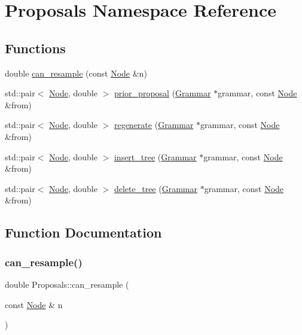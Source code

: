\hypertarget{namespace_proposals}{}\section{Proposals Namespace Reference}
\label{namespace_proposals}
\subsection*{Functions}
\begin{DoxyCompactItemize}
\item 
double \hyperlink{namespace_proposals_a73f20ef1547bc5beef3e6e3adad2139c}{can\+\_\+resample} (const \hyperlink{class_node}{Node} \&n)
\item 
std\+::pair$<$ \hyperlink{class_node}{Node}, double $>$ \hyperlink{namespace_proposals_a46b497d7c2d664181240aed4cc92ad73}{prior\+\_\+proposal} (\hyperlink{class_grammar}{Grammar} $\ast$grammar, const \hyperlink{class_node}{Node} \&from)
\item 
std\+::pair$<$ \hyperlink{class_node}{Node}, double $>$ \hyperlink{namespace_proposals_a186662fcd0316b831a4a08a8e64020b3}{regenerate} (\hyperlink{class_grammar}{Grammar} $\ast$grammar, const \hyperlink{class_node}{Node} \&from)
\item 
std\+::pair$<$ \hyperlink{class_node}{Node}, double $>$ \hyperlink{namespace_proposals_a7286635ba7407c6f47a6cde53b832741}{insert\+\_\+tree} (\hyperlink{class_grammar}{Grammar} $\ast$grammar, const \hyperlink{class_node}{Node} \&from)
\item 
std\+::pair$<$ \hyperlink{class_node}{Node}, double $>$ \hyperlink{namespace_proposals_a5359114c687c89b35ba672b9d4b3c7ad}{delete\+\_\+tree} (\hyperlink{class_grammar}{Grammar} $\ast$grammar, const \hyperlink{class_node}{Node} \&from)
\end{DoxyCompactItemize}


\subsection{Function Documentation}
\mbox{\label{namespace_proposals_a73f20ef1547bc5beef3e6e3adad2139c}} 
\subsubsection{\texorpdfstring{can\+\_\+resample()}{can\_resample()}}
{\footnotesize\ttfamily double Proposals\+::can\+\_\+resample (\begin{DoxyParamCaption}\item[{const \hyperlink{class_node}{Node} \&}]{n }\end{DoxyParamCaption})}

